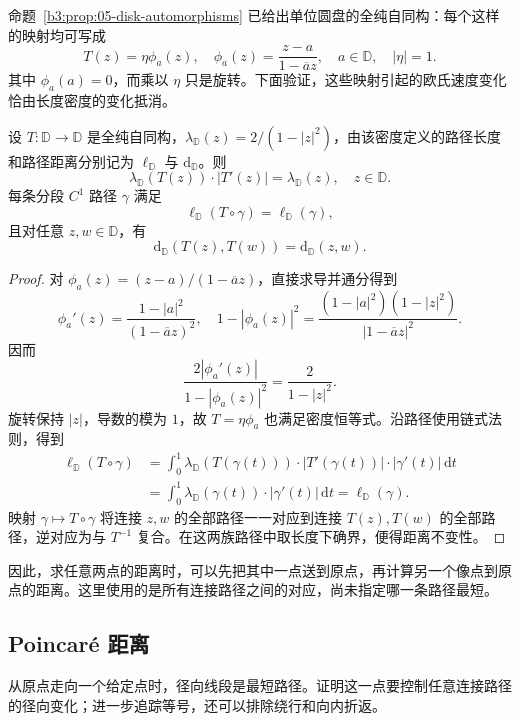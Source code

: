 命题~\ref{b3:prop:05-disk-automorphisms} 已给出单位圆盘的全纯自同构：每个这样的映射均可写成
\[
 T(z)=\eta\phi_a(z),
 \quad
 \phi_a(z)=\frac{z-a}{1-\overline a z},
 \quad a\in\mathbb D,
 \quad |\eta|=1.
\]
其中 \(\phi_a(a)=0\)，而乘以 \(\eta\) 只是旋转。下面验证，这些映射引起的欧氏速度变化恰由长度密度的变化抵消。

\begin{proposition}[圆盘自同构的等距性]\label{b3:prop:13-disk-isometry}
设 \(T:\mathbb D\to\mathbb D\) 是全纯自同构，\(\lambda_{\mathbb D}(z)=2/(1-|z|^2)\)，由该密度定义的路径长度和路径距离分别记为 \(\ell_{\mathbb D}\) 与 \(\mathrm d_{\mathbb D}\)。则
\[
 \lambda_{\mathbb D}(T(z))\cdot|T'(z)|
 =\lambda_{\mathbb D}(z),
 \quad z\in\mathbb D.
\]
每条分段 \(C^1\) 路径 \(\gamma\) 满足
\[
 \ell_{\mathbb D}(T\circ\gamma)=\ell_{\mathbb D}(\gamma),
\]
且对任意 \(z,w\in\mathbb D\)，有
\[
 \mathrm d_{\mathbb D}(T(z),T(w))=\mathrm d_{\mathbb D}(z,w).
\]
\end{proposition}
\begin{proof}
对 \(\phi_a(z)=(z-a)/(1-\overline a z)\)，直接求导并通分得到
\[
 \phi_a'(z)=\frac{1-|a|^2}{(1-\overline a z)^2},
 \quad
 1-|\phi_a(z)|^2
 =\frac{(1-|a|^2)(1-|z|^2)}{|1-\overline a z|^2}.
\]
因而
\[
 \frac{2|\phi_a'(z)|}{1-|\phi_a(z)|^2}
 =\frac{2}{1-|z|^2}.
\]
旋转保持 \(|z|\)，导数的模为 \(1\)，故 \(T=\eta\phi_a\) 也满足密度恒等式。沿路径使用链式法则，得到
\[
 \begin{aligned}
 \ell_{\mathbb D}(T\circ\gamma)
 &=\int_0^1\lambda_{\mathbb D}(T(\gamma(t)))
   \cdot|T'(\gamma(t))|\cdot|\gamma'(t)|\,\mathrm dt\\
 &=\int_0^1\lambda_{\mathbb D}(\gamma(t))
   \cdot|\gamma'(t)|\,\mathrm dt
 =\ell_{\mathbb D}(\gamma).
 \end{aligned}
\]
映射 \(\gamma\mapsto T\circ\gamma\) 将连接 \(z,w\) 的全部路径一一对应到连接 \(T(z),T(w)\) 的全部路径，逆对应为与 \(T^{-1}\) 复合。在这两族路径中取长度下确界，便得距离不变性。
\end{proof}

因此，求任意两点的距离时，可以先把其中一点送到原点，再计算另一个像点到原点的距离。这里使用的是所有连接路径之间的对应，尚未指定哪一条路径最短。

\subsection{Poincaré 距离}
\label{b3:subsec:130103}

从原点走向一个给定点时，径向线段是最短路径。证明这一点要控制任意连接路径的径向变化；进一步追踪等号，还可以排除绕行和向内折返。

